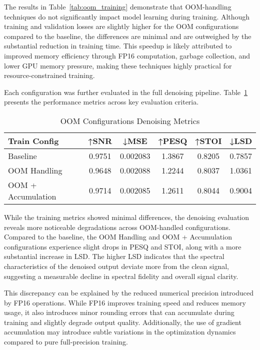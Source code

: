 The results in Table~\ref{tab:oom_training} demonstrate that OOM-handling techniques do not significantly impact model learning during training. Although training and validation losses are slightly higher for the OOM configurations compared to the baseline, the differences are minimal and are outweighed by the substantial reduction in training time. This speedup is likely attributed to improved memory efficiency through FP16 computation, garbage collection, and lower GPU memory pressure, making these techniques highly practical for resource-constrained training.

Each configuration was further evaluated in the full denoising pipeline. Table~\ref{tab:oom_metrics} presents the performance metrics across key evaluation criteria.

\vspace{1em}
\begin{table}[H]
\centering
\caption{OOM Configurations Denoising Metrics}
\label{tab:oom_metrics}
\begin{tabular}{|l|c|c|c|c|c|}
\hline
\textbf{Train Config} & \textbf{↑SNR} & \textbf{↓MSE} & \textbf{↑PESQ} & \textbf{↑STOI} & \textbf{↓LSD} \\
\hline
Baseline               & 0.9751 & 0.002083 & 1.3867 & 0.8205 & 0.7857 \\
OOM Handling           & 0.9648 & 0.002088 & 1.2244 & 0.8037 & 1.0361 \\
OOM + Accumulation     & 0.9714 & 0.002085 & 1.2611 & 0.8044 & 0.9004 \\
\hline
\end{tabular}
\end{table}

While the training metrics showed minimal differences, the denoising evaluation reveals more noticeable degradations across OOM-handled configurations. Compared to the baseline, the OOM Handling and OOM + Accumulation configurations experience slight drops in PESQ and STOI, along with a more substantial increase in LSD. The higher LSD indicates that the spectral characteristics of the denoised output deviate more from the clean signal, suggesting a measurable decline in spectral fidelity and overall signal clarity.

This discrepancy can be explained by the reduced numerical precision introduced by FP16 operations. While FP16 improves training speed and reduces memory usage, it also introduces minor rounding errors that can accumulate during training and slightly degrade output quality. Additionally, the use of gradient accumulation may introduce subtle variations in the optimization dynamics compared to pure full-precision training.

